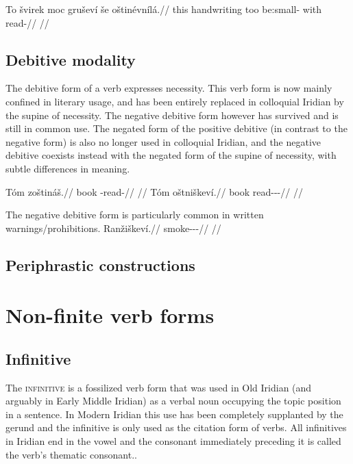 \pex
\begingl
\gla To švirek moc gruševí še oštinévnílá.//
\glb this handwriting too be:small- with read-//
\glft {}//
\endgl
\xe

\subsection{Debitive modality}

The debitive form of a verb expresses necessity. This verb form is now mainly
confined in literary usage, and has been entirely replaced in colloquial Iridian
by the supine of necessity. The negative debitive form however has
survived and is still in common use. The negated form of the
positive debitive (in contrast to the negative form) is also no longer used in
colloquial Iridian, and the negative debitive coexists instead with the negated
form of the supine of necessity, with subtle differences in meaning.

\begin{multicols}{2}
  \pex
  \a
  \begingl
  \gla Tóm zoštináš.//
  \glb book \Neg{}-read-\SupN{}//
  \glft {}//
  \endgl
  \a \begingl
  \gla Tóm oštniškeví.//
  \glb book read-\Pv{}-\N{}\Deb{}-\Cont{}//
  \glft {}//
  \endgl
  \xe
\end{multicols}

The negative debitive form is particularly common in written warnings/prohibitions.
\pex \begingl
  \gla Ranžiškeví.//
  \glb smoke-\Av{}-\N{}\Deb{}-\Cont{}//
  \glft {}//
  \endgl
\xe

\subsection{Periphrastic constructions}

\section{Non-finite verb forms}

\subsection{Infinitive}\label{sec:infinitive}

The {\scshape infinitive} is a fossilized verb form that was used in Old
Iridian (and arguably in Early Middle Iridian) as a verbal noun occupying the topic position in a
sentence. In Modern Iridian this use has been completely supplanted by the
gerund and the infinitive is only used as the citation
form of verbs. All infinitives in Iridian end in the vowel
 and the consonant immediately preceding it is called the verb's
thematic consonant..

